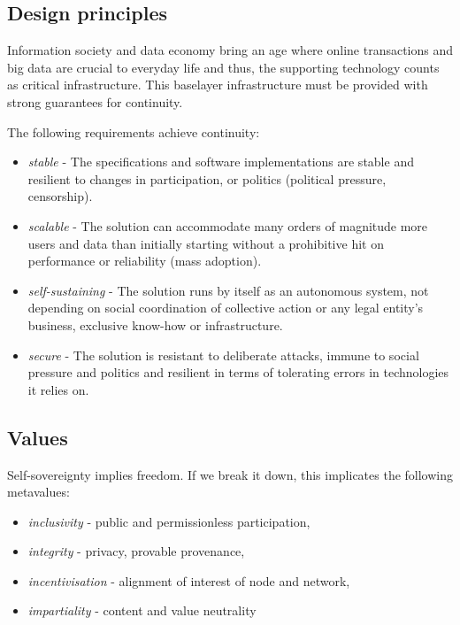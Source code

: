 \subsection{Design principles}\label{sec:design-principles}

Information society and data economy bring an age where online transactions and big data are crucial to everyday life and thus, the supporting technology counts as critical infrastructure. This baselayer infrastructure must be provided with strong guarantees for continuity. 

The following  requirements achieve continuity:
\begin{itemize}
\item \emph{stable} - The specifications and software implementations are stable and resilient to changes in participation, or politics (political pressure, censorship).
\item \emph{scalable} - The solution can accommodate many orders of magnitude more users and data than initially starting without a prohibitive hit on performance or reliability (mass adoption).
\item \emph{self-sustaining} - The solution runs by itself as an autonomous system, not depending on social coordination of collective action or any legal entity's business, exclusive know-how or infrastructure.   
\item \emph{secure} - The solution is resistant to deliberate attacks, immune to social pressure and politics and resilient in terms of tolerating errors in technologies it relies on. 
\end{itemize}



\subsection{Values}\label{sec:values}

Self-sovereignty implies freedom. If we break it down, this implicates the following metavalues: 

\begin{itemize}
\item \emph{inclusivity} - public and permissionless participation,  
\item \emph{integrity} - privacy, provable provenance, 
\item \emph{incentivisation} - alignment of interest of node and network,
\item \emph{impartiality} -  content and value neutrality  
\end{itemize}

